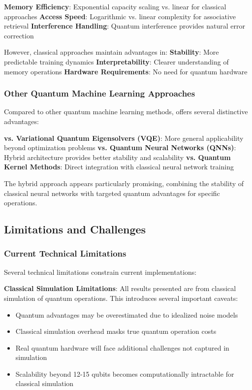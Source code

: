 \textbf{Memory Efficiency}: Exponential capacity scaling vs. linear for classical approaches
\textbf{Access Speed}: Logarithmic vs. linear complexity for associative retrieval
\textbf{Interference Handling}: Quantum interference provides natural error correction

However, classical approaches maintain advantages in:
\textbf{Stability}: More predictable training dynamics
\textbf{Interpretability}: Clearer understanding of memory operations
\textbf{Hardware Requirements}: No need for quantum hardware

\subsubsection{Other Quantum Machine Learning Approaches}

Compared to other quantum machine learning methods, \qmnn offers several distinctive advantages:

\textbf{vs. Variational Quantum Eigensolvers (VQE)}: More general applicability beyond optimization problems
\textbf{vs. Quantum Neural Networks (QNNs)}: Hybrid architecture provides better stability and scalability
\textbf{vs. Quantum Kernel Methods}: Direct integration with classical neural network training

The hybrid approach appears particularly promising, combining the stability of classical neural networks with targeted quantum advantages for specific operations.

\subsection{Limitations and Challenges}

\subsubsection{Current Technical Limitations}

Several technical limitations constrain current \qmnn implementations:

\textbf{Classical Simulation Limitations}: All results presented are from classical simulation of quantum operations. This introduces several important caveats:
\begin{itemize}
    \item Quantum advantages may be overestimated due to idealized noise models
    \item Classical simulation overhead masks true quantum operation costs
    \item Real quantum hardware will face additional challenges not captured in simulation
    \item Scalability beyond 12-15 qubits becomes computationally intractable for classical simulation
\end{itemize}

